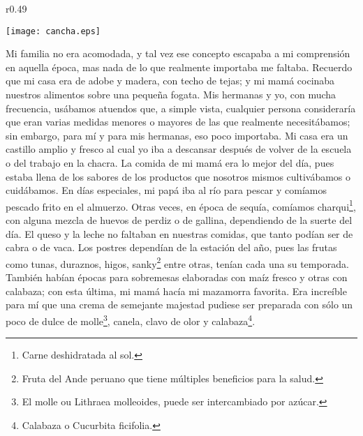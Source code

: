 \ifdefined\EnableIncludeImages
\begin{wrapfigure}{r}{0.49\textwidth}
  \begin{center}
  \vspace{-20pt}
    \texttt{[image: cancha.eps]}
  \end{center}
  \vspace{-20pt}
\end{wrapfigure}
\fi
Mi familia no era acomodada, y tal vez ese concepto escapaba a mi comprensión en aquella época, mas nada de lo que realmente importaba me faltaba.   
Recuerdo que mi casa era de adobe y madera, con techo de tejas; y mi mamá cocinaba nuestros alimentos sobre una pequeña fogata. Mis hermanas y yo, con mucha frecuencia, usábamos atuendos que, a simple vista, cualquier persona consideraría que eran varias medidas menores o mayores de las que realmente necesitábamos;
sin embargo, para mí y para mis hermanas, eso poco importaba. Mi casa era un castillo amplio y fresco al cual yo iba a descansar después de volver de la escuela o del trabajo en la chacra.
La comida de mi mamá era lo mejor del día, pues estaba llena de los sabores de los productos que nosotros mismos cultivábamos o cuidábamos. 
En días especiales, mi papá iba al río para pescar y comíamos pescado frito en el almuerzo. Otras veces, en época de sequía, comíamos charqui\footnote{Carne deshidratada al sol.}, con alguna mezcla de huevos de perdiz o de gallina, dependiendo de la suerte del día.
El queso y la leche no faltaban en nuestras comidas, que tanto podían ser de cabra o de vaca.
Los postres dependían de la estación del año, pues las frutas como tunas, duraznos, higos, sanky\footnote{Fruta del Ande peruano que tiene múltiples beneficios para la salud.} entre otras, tenían cada una su temporada. También habían épocas para sobremesas elaboradas con maíz fresco y otras con calabaza; con esta última, mi mamá hacía mi mazamorra favorita. Era increíble para mí que una crema de semejante majestad pudiese ser preparada con sólo un poco de dulce de molle\footnote{El molle ou Lithraea molleoides, puede ser intercambiado por azúcar.}, canela, clavo de olor y calabaza\footnote{Calabaza o Cucurbita ficifolia.}.

